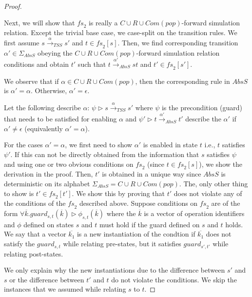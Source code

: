 \begin{proof}
\begin{itemize}
\end{itemize}
Next, we will show that $\mathit{fs}_2$ is really a $C\cup R\cup Com(pop)$-forward simulation relation. Except the trivial base case, we case-split on the transition rules. We first assume $s \xrightarrow{\alpha}_{TSS} s' $ and $t \in \mathit{fs}_2[s]$. Then, we find  corresponding transition $\alpha' \in \Sigma_{AbsS}$ obeying the $C\cup R\cup Com(pop)$-forward simulation relation conditions and obtain $t'$ such that $t \xrightarrow{\alpha'}_{AbsS} st $  and $t' \in \mathit{fs}_2[s']$.

We observe that if $\alpha \in C \cup R \cup Com(pop)$, then the corresponding rule in $AbsS$ is $\alpha' = \alpha$. Otherwise, $\alpha' = \epsilon$.

Let the following describe $\alpha$: $\psi \triangleright s\xrightarrow{\alpha}_{TSS} s'$ where $\psi$ is the precondition (guard) that needs to be satisfied for enabling $\alpha$ and $\psi' \triangleright t \xrightarrow{\alpha'}_{AbsS} t'$ describe the $\alpha'$ if $\alpha' \neq \epsilon$ (equivalently $\alpha' = \alpha$).

For the cases $\alpha' = \alpha$, we first need to show $\alpha'$ is enabled in state $t$ i.e., $t$ satisfies $\psi'$. If this can not be directly obtained from the information that $s$ satisfies $\psi$ and using one or two obvious conditions on $\mathit{fs}_2$ (since $t \in \mathit{fs}_2[s]$), we show the derivation in the proof. Then, $t'$ is obtained in a unique way since $AbsS$ is deterministic on its alphabet $ \Sigma_{AbsS} = C \cup R \cup Com(pop)$. The, only other thing to show is $t' \in \mathit{fs}_2[t']$. We show this by proving that $t'$ does not violate any of the conditions of the $\mathit{fs}_2$ described above. Suppose conditions on $\mathit{fs}_2$ are of the form $\forall \overline{k}. guard_{s,t}(\overline{k}) \triangleright \phi_{s,t}(\overline{k})$ where the $\overline{k}$ is a vector of operation identifiers and $\phi$ defined on states $s$ and $t$ must hold if the guard defined on $s$ and $t$ holds. We say that a vector $\overline{k_1}$ is a new instantiation of the condtion if $\overline{k_1}$ does not satisfy the $guard_{s,t}$ while relating pre-states, but it satisfies $guard_{s',t'}$ while relating post-states.

We only explain why the new instantiations due to the difference between $s'$ and $s$ or the difference between $t'$ and $t$ do not violate the conditions. We skip the instances that we assumed while relating $s$ to $t$.


\end{proof}
